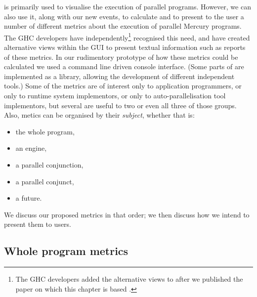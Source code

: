 \tscope is primarily used to visualise the execution of parallel programs.
However, we can also use it, along with our new events,
to calculate and to present to the user
a number of different metrics about the execution of parallel Mercury programs.
The GHC developers have independently\footnote{
    The GHC developers added the alternative views to \tscope after we
    published the paper on which this chapter is based
    \citep{pbone:2011:tscope}.}
recognised this need,
and have created alternative views within the \tscope GUI to present textual
information such as reports of these metrics.
In our rudimentory prototype of how these metrics could be calculated we
used a command line driven console interface.
(Some parts of \tscope are implemented as a library,
allowing the development of different independent tools.)
Some of the metrics are of interest
only to application programmers,
or only to runtime system implementors,
or only to auto-parallelisation tool implementors,
but several are useful to two or even all three of those groups.
Also, metics can be organised by their \emph{subject},
whether that is:
\begin{itemize}
    \item the whole program,

    \item an engine,

    \item a parallel conjunction,

    \item a parallel conjunct,

    \item a future.
\end{itemize}
We discuss our proposed metrics in that order;
we then discuss how we intend to present them to users.

%

\subsection{Whole program metrics}


